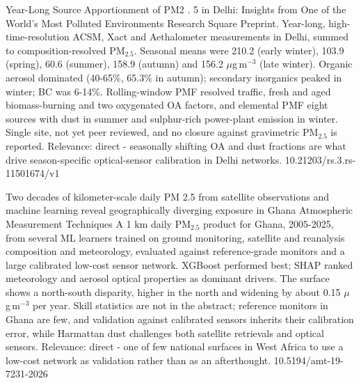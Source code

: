\documentclass[10pt]{article}
\begin{document}
{Year-Long Source Apportionment of PM2 . 5 in Delhi: Insights from One of the World's Most Polluted Environments}
{Research Square}
{Preprint. Year-long, high-time-resolution ACSM, Xact and Aethalometer measurements in Delhi, summed to composition-resolved PM$_{2.5}$. Seasonal means were 210.2 (early winter), 103.9 (spring), 60.6 (summer), 158.9 (autumn) and 156.2 $\mu$g\,m$^{-3}$ (late winter). Organic aerosol dominated (40-65\%, 65.3\% in autumn); secondary inorganics peaked in winter; BC was 6-14\%. Rolling-window PMF resolved traffic, fresh and aged biomass-burning and two oxygenated OA factors, and elemental PMF eight sources with dust in summer and sulphur-rich power-plant emission in winter. Single site, not yet peer reviewed, and no closure against gravimetric PM$_{2.5}$ is reported. Relevance: direct - seasonally shifting OA and dust fractions are what drive season-specific optical-sensor calibration in Delhi networks.}
{10.21203/rs.3.rs-11501674/v1}

{Two decades of kilometer-scale daily PM 2.5 from satellite observations and machine learning reveal geographically diverging exposure in Ghana}
{Atmospheric Measurement Techniques}
{A 1 km daily PM$_{2.5}$ product for Ghana, 2005-2025, from several ML learners trained on ground monitoring, satellite and reanalysis composition and meteorology, evaluated against reference-grade monitors and a large calibrated low-cost sensor network. XGBoost performed best; SHAP ranked meteorology and aerosol optical properties as dominant drivers. The surface shows a north-south disparity, higher in the north and widening by about 0.15 $\mu$g\,m$^{-3}$ per year. Skill statistics are not in the abstract; reference monitors in Ghana are few, and validation against calibrated sensors inherits their calibration error, while Harmattan dust challenges both satellite retrievals and optical sensors. Relevance: direct - one of few national surfaces in West Africa to use a low-cost network as validation rather than as an afterthought.}
{10.5194/amt-19-7231-2026}
\end{document}
